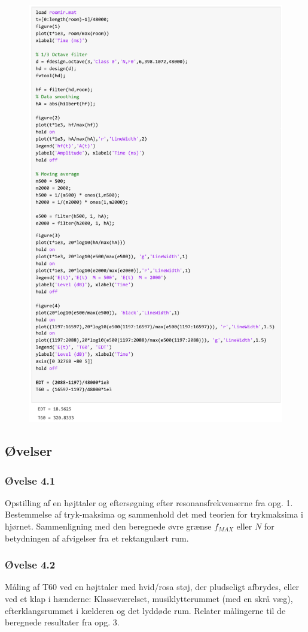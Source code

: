 \begin{figure} [H]
	\includegraphics[width=\linewidth]{graphics/52.png}
\end{figure}


\subsection{Øvelser}
\subsubsection{Øvelse 4.1}
Opstilling af en højttaler og eftersøgning efter resonansfrekvenserne fra opg. 1. Bestemmelse af tryk-maksima og sammenhold det med teorien for trykmaksima i hjørnet. Sammenligning med den beregnede øvre grænse $f_{MAX}$ eller $N$ for betydningen af afvigelser fra et rektangulært rum.

\subsubsection{Øvelse 4.2}
Måling af T60 ved en højttaler med hvid/rosa støj, der pludseligt afbrydes, eller ved et klap i hænderne: Klasseværelset, musiklytterummet (med en skrå væg), efterklangsrummet i kælderen og det lyddøde rum. Relater målingerne til de beregnede resultater fra opg. 3.
